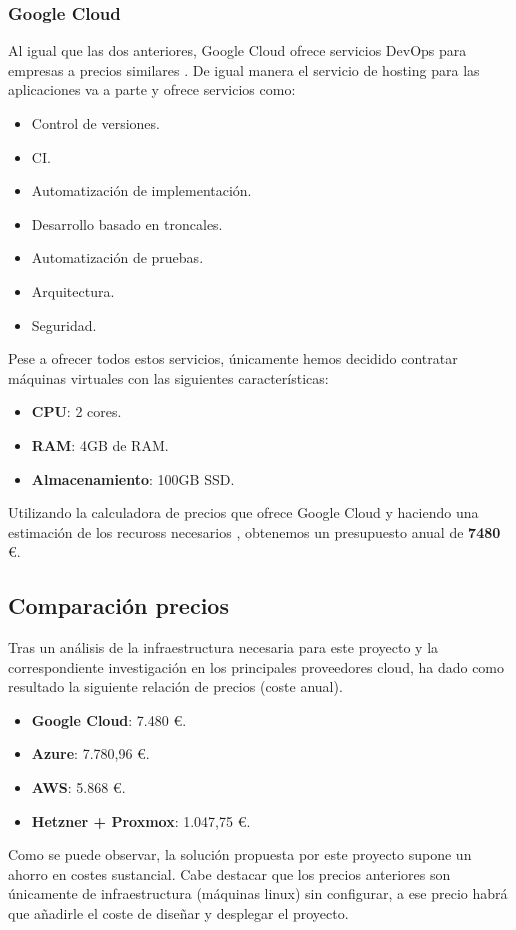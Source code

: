 		\subsubsection{Google Cloud}
			\begin{text}
				Al igual que las dos anteriores, Google Cloud ofrece servicios DevOps para empresas a precios similares \cite{GoogleCloud:online}. De igual manera el servicio de hosting para las aplicaciones va a parte y ofrece servicios como:
				\begin{itemize}
					\item Control de versiones.
					\item CI.
					\item Automatización de implementación.
					\item Desarrollo basado en troncales.
					\item Automatización de pruebas.
					\item Arquitectura.
					\item Seguridad.
				\end{itemize}
			
			Pese a ofrecer todos estos servicios, únicamente hemos decidido contratar máquinas virtuales con las siguientes características:
			
			\begin{itemize}
				\item \textbf{CPU}: 2 cores.
				\item \textbf{RAM}: 4GB de RAM.
				\item \textbf{Almacenamiento}: 100GB SSD.
			\end{itemize}
			
			Utilizando la calculadora de precios que ofrece Google Cloud \cite{googlecloudcalculadora:online} y haciendo una estimación de los recuross necesarios , obtenemos un presupuesto anual de \textbf{7480} \euro.
			\end{text}
		
		\subsection{Comparación precios}
		\label{comparacion_precios}
			\begin{text}
				Tras un análisis de la infraestructura necesaria para este proyecto y la correspondiente investigación en los principales proveedores cloud, ha dado como resultado la siguiente relación de precios (coste anual).
				\begin{itemize}
					\item \textbf{Google Cloud}: 7.480 \euro.
					\item \textbf{Azure}: 7.780,96 \euro.
					\item \textbf{AWS}: 5.868 \euro.
					\item \textbf{Hetzner + Proxmox}: 1.047,75 \euro.
				\end{itemize}	
			Como se puede observar, la solución propuesta por este proyecto supone un ahorro en costes sustancial. Cabe destacar que los precios anteriores son únicamente de infraestructura (máquinas linux) sin configurar, a ese precio habrá que añadirle el coste de diseñar y desplegar el proyecto.
			\end{text}
		
